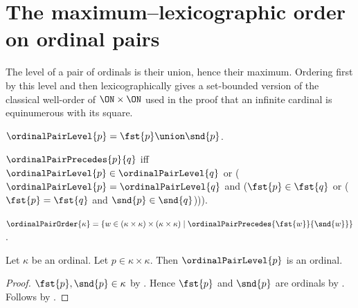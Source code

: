 \section{The maximum--lexicographic order on ordinal pairs}




The level of a pair of ordinals is their union, hence their maximum.  Ordering
first by this level and then lexicographically gives a set-bounded version of
the classical well-order of $\ON\times\ON$ used in the proof that an infinite
cardinal is equinumerous with its square.

\begin{definition}\label{ordinal_pair_level}
    $\ordinalPairLevel{p}=\fst{p}\union\snd{p}$.
\end{definition}

\begin{definition}\label{ordinal_pair_precedes}
    $\ordinalPairPrecedes{p}{q}$ iff
        $\ordinalPairLevel{p}\in\ordinalPairLevel{q}$ or
        ($\ordinalPairLevel{p}=\ordinalPairLevel{q}$ and
            ($\fst{p}\in\fst{q}$ or
                ($\fst{p}=\fst{q}$ and $\snd{p}\in\snd{q}$))).
\end{definition}

\begin{definition}\label{ordinal_pair_order}
    $\ordinalPairOrder{\kappa}
        =\{w\in(\kappa\times\kappa)\times(\kappa\times\kappa)\mid
            \ordinalPairPrecedes{\fst{w}}{\snd{w}}\}$.
\end{definition}

\begin{proposition}\label{ordinal_pair_level_is_ordinal}
    Let $\kappa$ be an ordinal.
    Let $p\in\kappa\times\kappa$.
    Then $\ordinalPairLevel{p}$ is an ordinal.
\end{proposition}
\begin{proof}
    $\fst{p},\snd{p}\in\kappa$ by .
    Hence $\fst{p}$ and $\snd{p}$ are ordinals
        by .
    Follows by
        .
\end{proof}

